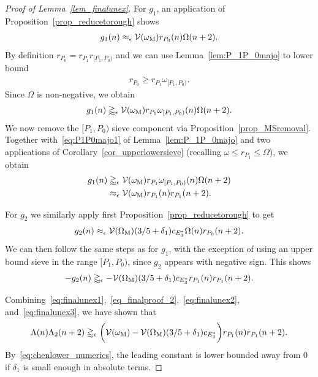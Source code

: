 \documentclass[12pt]{amsart}
\theoremstyle{definition}
\theoremstyle{remark}
\numberwithin{equation}{section}
\newcommand{\1}{\mathbf{1}}
\begin{document}
\begin{proof}[Proof of Lemma~\ref{lem_finalunex}]
 
 For $g_1$, an application of Proposition~\ref{prop_reducetorough} shows
    \begin{align*}
        g_1(n)\approx_\epsilon  \mathcal{V}(\omega_{\textup{M}}) r_{P_0}(n)\Omega(n+2).
    \end{align*}
    By definition $r_{P_0}=r_{P_1}r_{[P_1,P_0)}$ and we can use Lemma~\ref{lem:P_1P_0majo} to lower bound
    \begin{align*}
        r_{P_0}\geq r_{P_1} \omega_{[P_1,P_0)}.
    \end{align*}
    Since $\Omega$ is non-negative, we obtain
    \begin{align*}
        g_1(n)\gtrapprox_{\epsilon} \mathcal{V}(\omega_{\textup{M}}) r_{P_1} \omega_{[P_1,P_0)}(n)\Omega(n+2).
    \end{align*}
    We now remove the $[P_1,P_0)$ sieve component via Proposition~\ref{prop_MSremoval}. Together with~\eqref{eq:P1P0majo1} of Lemma~\ref{lem:P_1P_0majo} and  two applications of Corollary~\ref{cor_upperlowersieve} (recalling $\omega\leq r_{P_1}\leq \Omega$), we obtain
    \begin{align}
        \nonumber g_1(n)&\gtrapprox_{\epsilon}  \mathcal{V}(\omega_{\textup{M}}) r_{P_1} \omega_{[P_1,P_0)}(n)\Omega(n+2)\\
       \label{eq:finalunex2} &\approx_{\epsilon} \mathcal{V}(\omega_{\textup{M}}) r_{P_1}(n)r_{P_1}(n+2).
    \end{align}



For $g_2$ we similarly apply first Proposition~\ref{prop_reducetorough} to get
\begin{align*}
    g_2(n)\approx_\epsilon \mathcal{V}(\Omega_{\textup{M}})(3/5+\delta_1)c_{E_3^*}\Omega(n) r_{P_0}(n+2).
\end{align*}
We can then follow the same steps as for $g_1$, with the exception of using an upper bound sieve in the range $[P_1,P_0)$, since $g_2$ appears with negative sign. This shows
\begin{align}
      \label{eq:finalunex3}   -g_2(n)\gtrapprox_{\epsilon}  -\mathcal{V}(\Omega_{\textup{M}})(3/5+\delta_1)c_{E_3^*} r_{P_1}(n)r_{P_1}(n+2).
\end{align}

	
    Combining~\eqref{eq:finalunex1},~\eqref{eq_finalproof_2},~\eqref{eq:finalunex2}, and~\eqref{eq:finalunex3}, we have shown that
    \begin{align*}
        \Lambda(n)\Lambda_2(n+2) \gtrapprox_{\epsilon} \bigg(\mathcal{V}(\omega_{\textup{M}})-\mathcal{V}(\Omega_{\textup{M}})(3/5+\delta_1)c_{E_3^{*}}\bigg) r_{P_1}(n)r_{P_1}(n+2).
    \end{align*}
    By~\eqref{eq:chenlower_numerics}, the leading constant is lower bounded away from $0$ if $\delta_1$ is small enough in absolute terms. 
    \end{proof}
\end{document}
